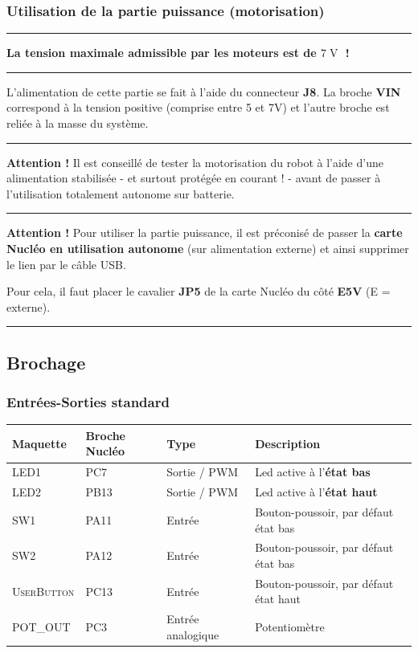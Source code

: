 \documentclass[a4paper,11pt,titlepage]{article} %
\begin{document}
\subsubsection{Utilisation de la partie puissance (motorisation)}

\noindent \rule{\linewidth}{1pt}

\medskip

\textbf{\large La tension maximale admissible par les moteurs est de $7\operatorname{V}$ !}

\noindent \rule{\linewidth}{1pt}

L'alimentation de cette partie se fait à l'aide du connecteur \textbf{J8}. La broche \textbf{VIN} correspond à la tension positive (comprise entre 5 et 7V) et l'autre broche est reliée à la masse du système.


\noindent \rule{\linewidth}{1pt}

\textbf{Attention !} Il est conseillé de tester la motorisation du robot à l'aide d'une alimentation stabilisée - et surtout protégée en courant ! - avant de passer à l'utilisation totalement autonome sur batterie.


\noindent \rule{\linewidth}{1pt}

\textbf{Attention !} Pour utiliser la partie puissance, il est préconisé de passer la \textbf{carte Nucléo en utilisation autonome} (sur alimentation externe) et ainsi supprimer le lien par le câble USB.

Pour cela, il faut placer le cavalier \textbf{JP5} de la carte Nucléo du côté \textbf{E5V} (E = externe).

\noindent \rule{\linewidth}{1pt}


\newpage
\subsection{Brochage}

\subsubsection{Entrées-Sorties standard}

\begin{center}
\begin{tabular}{|l|l|l|l|}
\hline 
Maquette & \textbf{Broche Nucléo} & Type & Description \\ 
\hline 
\textsc{LED1} & PC7 & Sortie / PWM & Led active à l'\textbf{état bas}\\ 
\textsc{LED2} & PB13 & Sortie / PWM & Led active à l'\textbf{état haut}\\ 
\hline 
\textsc{SW1} & PA11 & Entrée & Bouton-poussoir, par défaut état bas\\ 
\textsc{SW2} & PA12 & Entrée & Bouton-poussoir, par défaut état bas\\ 
\textsc{UserButton} & PC13 & Entrée & Bouton-poussoir, par défaut état haut\\
\hline  
\textsc{POT\_OUT} & PC3 & Entrée analogique & Potentiomètre\\
\hline  
\end{tabular} 
\end{center}
\end{document}
